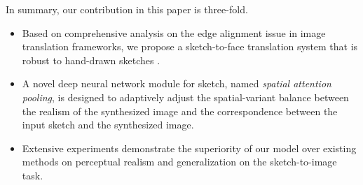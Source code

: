 In summary, our contribution in this paper is three-fold.
\begin{itemize}
\item Based on comprehensive analysis on the edge alignment issue in image translation frameworks, we propose a sketch-to-face translation system that is robust to hand-drawn sketches . 
\item A novel deep neural network module for sketch, named \emph{spatial attention pooling}, is designed to adaptively adjust the spatial-variant balance between the realism of the synthesized image and the correspondence between the input sketch and the synthesized image.
\item Extensive experiments demonstrate the superiority of our model over existing methods on perceptual realism and generalization on the sketch-to-image task.
\end{itemize}